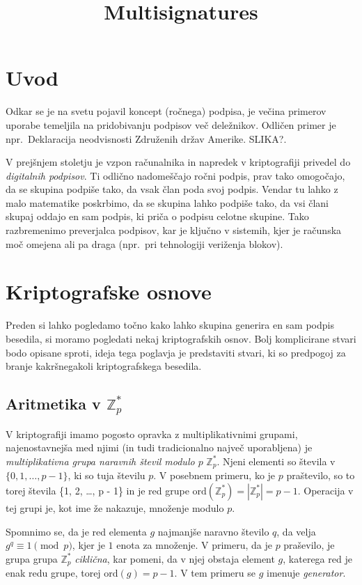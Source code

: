 \documentclass[isrm2, tisk]{fmfdelo}
\title{Multisignatures}
\newcommand{\Z}{\mathbb Z}
\begin{document}
\section{Uvod}
Odkar se je na svetu pojavil koncept (ročnega) podpisa, je večina primerov uporabe temeljila na
pridobivanju podpisov več deležnikov. Odličen primer je npr.\ Deklaracija neodvisnosti Združenih 
držav Amerike. SLIKA?. 

V prejšnjem stoletju je vzpon računalnika in napredek v kriptografiji privedel do \textit{digitalnih
podpisov}. Ti odlično nadomeščajo ročni podpis, prav tako omogočajo, da se skupina podpiše tako, 
da vsak član poda svoj podpis. Vendar tu lahko z malo matematike poskrbimo, da se skupina lahko 
podpiše tako, da vsi člani skupaj oddajo en sam podpis, ki priča o podpisu celotne skupine. Tako 
razbremenimo preverjalca podpisov, kar je ključno v sistemih, kjer je računska moč omejena ali 
pa draga (npr.\ pri tehnologiji veriženja blokov).

\section{Kriptografske osnove}
Preden si lahko pogledamo točno kako lahko skupina generira en sam podpis besedila, si moramo 
pogledati nekaj kriptografskih osnov. Bolj komplicirane stvari bodo opisane sproti, ideja tega 
poglavja je predstaviti stvari, ki so predpogoj za branje kakršnegakoli kriptografskega 
besedila.

\subsection{Aritmetika v $\Z_p^*$}
V kriptografiji imamo pogosto opravka z multiplikativnimi grupami, najenostavnejša med njimi (in 
tudi tradicionalno največ uporabljena) je \textit{multiplikativna grupa naravnih števil modulo $p$} 
$\Z_p^*$. Njeni elementi so števila v $\{0, 1, \dots, p - 1\}$, ki so tuja številu $p$. V posebnem 
primeru, ko je $p$ praštevilo, so to torej števila \{1, 2, \dots, p - 1\} in je red grupe 
$\text{ord}(\Z_p^*) = |\Z_p^*| = p - 1$. Operacija v tej grupi je, kot ime že nakazuje, množenje 
modulo $p$.

Spomnimo se, da je red elementa $g$ najmanjše naravno število $q$, da velja $g^q \equiv 1 \pmod p$, 
kjer je $1$ enota za množenje. V primeru, da je $p$ praševilo, je grupa grupa $\Z_p^*$ \textit{ciklična}, 
kar pomeni, da v njej obstaja element $g$, katerega red je enak redu grupe, torej $\text{ord}(g) = p - 1$.
V tem primeru se $g$ imenuje \textit{generator}.
\end{document}
